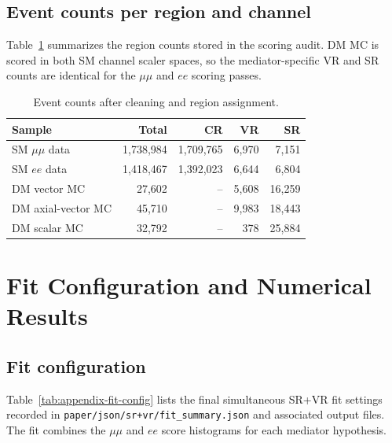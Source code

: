 \documentclass[11pt,a4paper,twocolumn]{article}
\begin{document}
\subsection{Event counts per region and channel}
\label{app:region-yields}

Table~\ref{tab:appendix-region-yields} summarizes the region counts stored in the scoring
audit. DM MC is scored in both SM channel scaler spaces, so the mediator-specific VR and
SR counts are identical for the \(\mu\mu\) and \(ee\) scoring passes.

\begin{table}[h]
\centering
\small
\caption{Event counts after cleaning and region assignment.}
\label{tab:appendix-region-yields}

\begin{tabular}{lrrrr}
\toprule
Sample & Total & CR & VR & SR \\
\midrule
SM \(\mu\mu\) data & 1,738,984 & 1,709,765 & 6,970 & 7,151 \\
SM \(ee\) data & 1,418,467 & 1,392,023 & 6,644 & 6,804 \\
DM vector MC & 27,602 & -- & 5,608 & 16,259 \\
DM axial-vector MC & 45,710 & -- & 9,983 & 18,443 \\
DM scalar MC & 32,792 & -- & 378 & 25,884 \\
\bottomrule
\end{tabular}

\end{table}

\clearpage
\section{Fit Configuration and Numerical Results}
\label{app:fit-results}

\subsection{Fit configuration}
\label{app:fit-configuration}

Table~\ref{tab:appendix-fit-config} lists the final simultaneous SR+VR fit settings
recorded in \texttt{paper/json/sr+vr/fit\_summary.json} and associated output files.
The fit combines the \(\mu\mu\) and \(ee\) score histograms for each mediator hypothesis.
\end{document}
